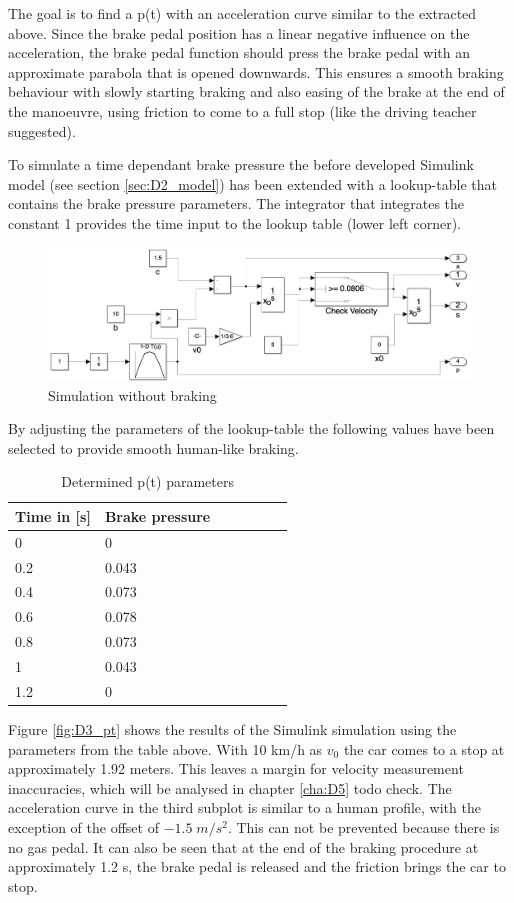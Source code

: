 The goal is to find a p(t) with an acceleration curve similar to the extracted above.
Since the brake pedal position has a linear negative influence on the acceleration, the brake pedal function should press the brake pedal with an approximate parabola that is opened downwards.
This ensures a smooth braking behaviour with slowly starting braking and also easing of the brake at the end of the manoeuvre, using friction to come to a full stop (like the driving teacher suggested).

To simulate a time dependant brake pressure the before developed Simulink model (see section \ref{sec:D2_model}) has been extended with a lookup-table that contains the brake pressure parameters.
The integrator that integrates the constant 1 provides the time input to the lookup table (lower left corner).
\begin{figure}[H]
\centering
\includegraphics[width=1\textwidth]{images/D3_model_extension.png}
\caption{Simulation without braking}
\label{fig:D3_IndividualBraking2}
\end{figure}
By adjusting the parameters of the lookup-table the following values have been selected to provide smooth human-like braking.
\begin{table}[H]
\centering
\caption{Determined p(t) parameters}
\renewcommand{\arraystretch}{1}
\begin{tabular}{lllllll}
\textbf{Time in [s]} & \textbf{Brake pressure}\\\hline
0 & 0\\
0.2  & 0.043\\
0.4  & 0.073\\
0.6  & 0.078\\
0.8  & 0.073\\
1  & 0.043\\
1.2  & 0\\
\end{tabular}
\end{table}

Figure \ref{fig:D3_pt} shows the results of the Simulink simulation using the parameters from the table above.
With 10 km/h as $v_0$ the car comes to a stop at approximately 1.92 meters.
This leaves a margin for velocity measurement inaccuracies, which will be analysed in chapter \ref{cha:D5} todo check.
The acceleration curve in the third subplot is similar to a human profile, with the exception of the offset of $-1.5\; m/s^2$.
This can not be prevented because there is no gas pedal.
It can also be seen that at the end of the braking procedure at approximately 1.2 s, the brake pedal is released and the friction brings the car to stop.

